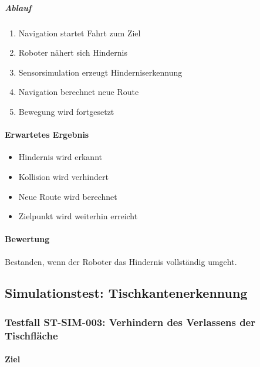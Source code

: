 \subparagraph{Ablauf}\label{ablauf-17}

\begin{enumerate}
\def\labelenumi{\arabic{enumi}.}
\tightlist
\item
  Navigation startet Fahrt zum Ziel
\item
  Roboter nähert sich Hindernis
\item
  Sensorsimulation erzeugt Hinderniserkennung
\item
  Navigation berechnet neue Route
\item
  Bewegung wird fortgesetzt
\end{enumerate}

\paragraph{Erwartetes Ergebnis}\label{erwartetes-ergebnis-17}

\begin{itemize}
\tightlist
\item
  Hindernis wird erkannt
\item
  Kollision wird verhindert
\item
  Neue Route wird berechnet
\item
  Zielpunkt wird weiterhin erreicht
\end{itemize}

\paragraph{Bewertung}\label{bewertung-17}

Bestanden, wenn der Roboter das Hindernis vollständig umgeht.

\subsection{Simulationstest:
Tischkantenerkennung}\label{simulationstest-tischkantenerkennung}

\subsubsection{Testfall ST-SIM-003: Verhindern des Verlassens der
Tischfläche}\label{testfall-st-sim-003-verhindern-des-verlassens-der-tischfluxe4che}

\paragraph{Ziel}\label{ziel-18}

